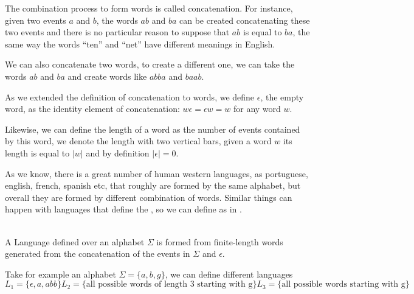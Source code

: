 The combination process to form words is called concatenation. For instance,
given two events $a$ and $b$, the words $ab$ and $ba$ can be created concatenating these two events and there is no particular reason to suppose that $ab$ is equal to $ba$, the same way the words ``ten'' and ``net'' have different meanings in English.

We can also concatenate two words, to create a different one, we can take the
words $ab$ and $ba$ and create words like $abba$ and $baab$.

As we extended the definition of concatenation to words, we define $\epsilon$,
the empty word, as the identity element of concatenation: $w\epsilon = \epsilon
w = w$ for any word $w$.

Likewise, we can define the length of a word as the number of events contained
by this word, we denote the length with two vertical bars, given a word $w$ its
length is equal to $|w|$ and by definition $|\epsilon| = 0 $.

As we know, there is a great number of human western languages, as portuguese,
english, french, spanish etc, that roughly are formed by the same alphabet, but
overall they are formed by different combination of words. Similar things can
happen with languages that define the \DESs, so we can define as in
\cite{cassandras2009introduction}.
\begin{definition}[Language]
  \label{def:language}~\\
  A Language defined over an alphabet $\Sigma$ is formed from finite-length
  words generated from the concatenation of the events in $\Sigma$ and
  $\epsilon$.
\end{definition}

Take for example an alphabet $\Sigma = \{a,b,g\}$, we can define different
languages
\begin{subequations}
  \begin{equation*}
  L_1=\{\epsilon, a, abb\}
  \end{equation*}
  \begin{equation*}
  L_2=\{\text{all possible words of length 3 starting with g}\}
  \end{equation*}
  \begin{equation*}
  L_3=\{\text{all possible words starting with g}\}
  \end{equation*}
\end{subequations}

